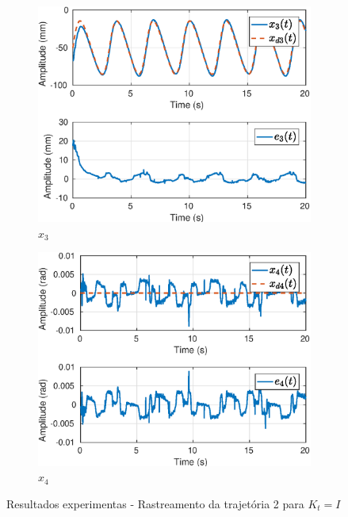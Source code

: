 \begin{figure}[H]
\begin{subfigure}{.5\textwidth}
  \includegraphics[width=\linewidth]{./img/traj_2_k1/x3.eps}
  \caption{$x_3$}
  \label{fig:sub1}
\end{subfigure}%
\begin{subfigure}{.5\textwidth}
  \centering
  \includegraphics[width=\linewidth]{./img/traj_2_k1/x4.eps}
  \caption{$x_4$}
  \label{fig:sub2}
\end{subfigure}
\caption{Resultados experimentas - Rastreamento da trajetória 2 para ${K}_t = {I}$}
\label{fig:test}
\end{figure}

